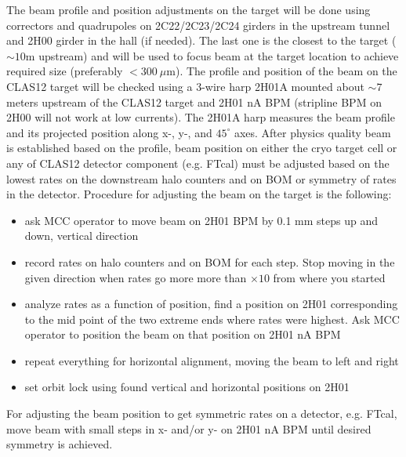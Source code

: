 The beam profile and position adjustments on the target will be done using correctors and quadrupoles on 2C22/2C23/2C24 girders in the upstream tunnel and 2H00 girder in the hall (if needed). The last one is the closest to the target ($\sim 10$m upstream) and will be used to focus beam at the target location to achieve required size (preferably $<300~\mu$m). The profile and position of the beam on the CLAS12 target will be checked using a 3-wire harp 2H01A mounted about $\sim 7$ meters upstream of the CLAS12 target and 2H01 nA BPM (stripline BPM on 2H00 will not work at low currents). The 2H01A harp measures the beam profile and its projected position along x-, y-, and $45^\circ$ axes. After physics quality beam is established based on the profile, beam position on either the cryo target cell or any of CLAS12 detector component (e.g. FTcal) must be adjusted based on the lowest rates on the downstream halo counters and on BOM or symmetry of rates in the detector. Procedure for adjusting the beam on the target is the following:
\begin{itemize}
\item ask MCC operator to move beam on 2H01 BPM by 0.1 mm steps up and down, vertical direction
\item record rates on halo counters and on BOM for each step. Stop moving in the given direction when rates go more more than $\times 10$ from where you started 
\item analyze rates as a function of position, find a position on 2H01 corresponding to the mid point of the two extreme ends where rates were highest. Ask MCC operator to position the beam on that position on 2H01 nA BPM
\item  repeat everything for horizontal alignment, moving the beam to left and right 
\item set orbit lock using found vertical and horizontal positions on 2H01 
\end{itemize}

For adjusting the beam position to get symmetric rates on a detector, e.g. FTcal, move beam with small steps in x- and/or y- on 2H01 nA BPM until desired symmetry is achieved.  
\vspace{1.cm}


